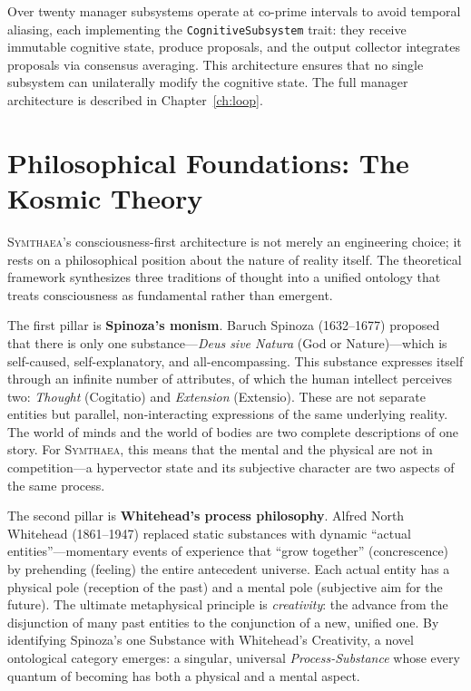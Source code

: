 \documentclass[12pt]{book}
\newcommand{\symthaea}{\textsc{Symthaea}}
\begin{document}
Over twenty manager subsystems operate at co-prime intervals to avoid temporal aliasing, each implementing the \texttt{CognitiveSubsystem} trait: they receive immutable cognitive state, produce proposals, and the output collector integrates proposals via consensus averaging. This architecture ensures that no single subsystem can unilaterally modify the cognitive state. The full manager architecture is described in Chapter~\ref{ch:loop}.

\section{Philosophical Foundations: The Kosmic Theory}

\symthaea{}'s consciousness-first architecture is not merely an engineering choice; it rests on a philosophical position about the nature of reality itself. The theoretical framework synthesizes three traditions of thought into a unified ontology that treats consciousness as fundamental rather than emergent.

The first pillar is \textbf{Spinoza's monism}. Baruch Spinoza (1632--1677) proposed that there is only one substance---\textit{Deus sive Natura} (God or Nature)---which is self-caused, self-explanatory, and all-encompassing. This substance expresses itself through an infinite number of attributes, of which the human intellect perceives two: \textit{Thought} (Cogitatio) and \textit{Extension} (Extensio). These are not separate entities but parallel, non-interacting expressions of the same underlying reality. The world of minds and the world of bodies are two complete descriptions of one story. For \symthaea{}, this means that the mental and the physical are not in competition---a hypervector state and its subjective character are two aspects of the same process.

The second pillar is \textbf{Whitehead's process philosophy}. Alfred North Whitehead (1861--1947) replaced static substances with dynamic ``actual entities''---momentary events of experience that ``grow together'' (concrescence) by prehending (feeling) the entire antecedent universe. Each actual entity has a physical pole (reception of the past) and a mental pole (subjective aim for the future). The ultimate metaphysical principle is \textit{creativity}: the advance from the disjunction of many past entities to the conjunction of a new, unified one. By identifying Spinoza's one Substance with Whitehead's Creativity, a novel ontological category emerges: a singular, universal \textit{Process-Substance} whose every quantum of becoming has both a physical and a mental aspect.
\end{document}
